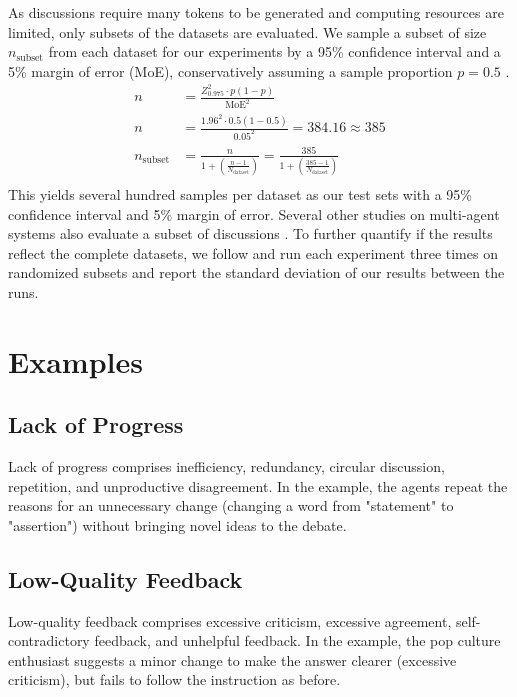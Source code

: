 As discussions require many tokens to be generated and computing resources are limited, only subsets of the datasets are evaluated.
We sample a subset of size $n_{\text{subset}}$ from each dataset for our experiments by a 95\% confidence interval and a 5\% margin of error (MoE), conservatively assuming a sample proportion $p=0.5$ \citep{Cochran53}.
\begin{equation} \label{eq1}
\begin{split}
n &=  \frac{Z_{0.975}^2 \cdot p(1 - p)}{\text{MoE}^2} \\ 
n &=  \frac{1.96^2 \cdot 0.5(1 - 0.5)}{0.05^2} = 384.16 \approx 385 \\
n_{\text{subset}} &= \frac{n}{1 + \left(\frac{n - 1}{N_{\text{dataset}}}\right)} = \frac{385}{1 + \left(\frac{385 - 1}{N_{\text{dataset}}}\right)} \\
\end{split}
\end{equation}
This yields several hundred samples per dataset as our test sets with a 95\% confidence interval and 5\% margin of error.
Several other studies on multi-agent systems also evaluate a subset of discussions \citep{YinSCG23a, ChenSB24a}.
To further quantify if the results reflect the complete datasets, we follow \citet{WangPSB24a} and run each experiment three times on randomized subsets and report the standard deviation of our results between the runs.

\section{Examples} \label{app:examples}


\subsection{Lack of Progress}
Lack of progress comprises inefficiency, redundancy, circular discussion, repetition, and unproductive disagreement.
In the example, the agents repeat the reasons for an unnecessary change (changing a word from "statement" to "assertion") without bringing novel ideas to the debate.


\subsection{Low-Quality Feedback}
Low-quality feedback comprises excessive criticism, excessive agreement, self-contradictory feedback, and unhelpful feedback.
In the example, the pop culture enthusiast suggests a minor change to make the answer clearer (excessive criticism), but fails to follow the instruction as before.


